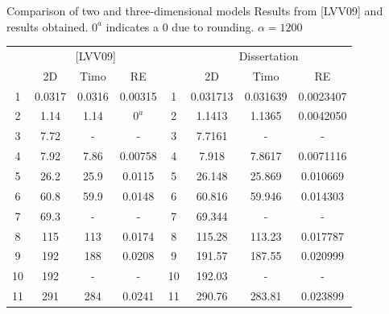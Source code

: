 \documentclass[8pt]{beamer}
\begin{document}
        
        \begin{frame}{Comparison of two and three-dimensional models}
            \centering
            \footnotesize
            \renewcommand{\arraystretch}{0.9}
            Results from [LVV09] and results obtained. $0^a$ indicates a 0 due to rounding. $\alpha = 1200$
        
            \begin{tabular}{cccc|cccc}
                \hline
                & \multicolumn{3}{c}{[LVV09]} & & \multicolumn{3}{c}{Dissertation} \\
                
                & 2D & Timo & RE & & 2D & Timo & RE \\
                \hline
                1 & 0.0317 & 0.0316 & 0.00315 & 1 & 0.031713 & 0.031639 & 0.0023407 \\
                2 & 1.14 & 1.14 & $0^a$ & 2 & 1.1413 & 1.1365 & 0.0042050 \\
                3 & 7.72 & - & - & 3 & 7.7161 & - & - \\
                4 & 7.92 & 7.86 & 0.00758 & 4 & 7.918 & 7.8617 & 0.0071116 \\
                5 & 26.2 & 25.9 & 0.0115 & 5 & 26.148 & 25.869 & 0.010669 \\
                6 & 60.8 & 59.9 & 0.0148 & 6 & 60.816 & 59.946 & 0.014303 \\
                7 & 69.3 & - & - & 7 & 69.344 & - & - \\
                8 & 115 & 113 & 0.0174 & 8 & 115.28 & 113.23 & 0.017787 \\
                9 & 192 & 188 & 0.0208 & 9 & 191.57 & 187.55 & 0.020999 \\
                10 & 192 & - & - & 10 & 192.03 & - & - \\
                11 & 291 & 284 & 0.0241 & 11 & 290.76 & 283.81 & 0.023899 \\
                \hline
            \end{tabular}
        
        \end{frame}
        
\end{document}
